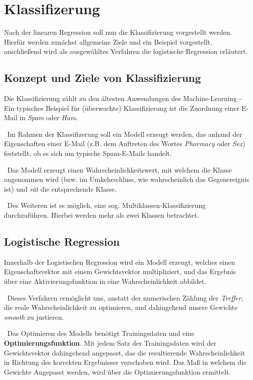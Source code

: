 \section{Klassifizerung}
\label{sec:Klassifizierung}
Nach der linearen Regression soll nun die Klassifizierung vorgestellt werden. Hierfür werden zunächst allgemeine Ziele und ein Beispiel vorgestellt, anschließend wird als ausgewähltes Verfahren die logistische Regression erläutert. 
 
\subsection{Konzept und Ziele von Klassifizierung}
Die Klassifizierung zählt zu den ältesten Anwendungen des Machine-Learning - Ein typisches Beispiel für (überwachte) Klassifizierung ist die Zuordnung einer E-Mail in \textit{Spam} oder \textit{Ham}.

~\newline Im Rahmen der Klassifizerung soll ein Modell erzeugt werden, das anhand der Eigenschaften einer E-Mail (z.B. dem Auftreten des Wortes \textit{Pharmacy} oder \textit{Sex}) feststellt, ob es sich um typische Spam-E-Mails handelt. 

~\newline Das Modell erzeugt einen Wahrscheinlichkeitswert, mit welchem die Klasse angenommen wird (bzw. im Umkehrschluss, wie wahrscheinlich das Gegenereignis ist) und \textit{rät} die entsprechende Klasse. 

~\newline Des Weiteren ist es möglich, eine sog. Multiklassen-Klassifizierung durchzuführen. Hierbei werden mehr als zwei Klassen betrachtet. 
\subsection{Logistische Regression}
\label{subsec:LogRegAcc}
Innerhalb der Logistischen Regression wird ein Modell erzeugt, welches einen Eigenschaftsvektor mit einem Gewichtsvektor multipliziert, und das Ergebnis über eine Aktivierungsfunktion in eine Wahrscheinlichkeit abbildet. 

~\newline Dieses Verfahren ermöglicht uns, anstatt der numerischen Zählung der \textit{Treffer}, die reale Wahrscheinlichkeit zu optimieren, und dahingehend unsere Gewichte \textit{smooth} zu justieren. 

~\newline Das Optimieren des Modells benötigt Trainingsdaten und eine \textbf{Optimierungsfunktion}. Mit jedem Satz der Trainingsdaten wird der Gewichtsvektor dahingehend angepasst, das die resultierende Wahrscheinlichkeit in Richtung des korrekten Ergebnisses verschoben wird. Das Maß in welchem die Gewichte Angepasst werden, wird über die Optimierungsfunktion ermittelt. 

